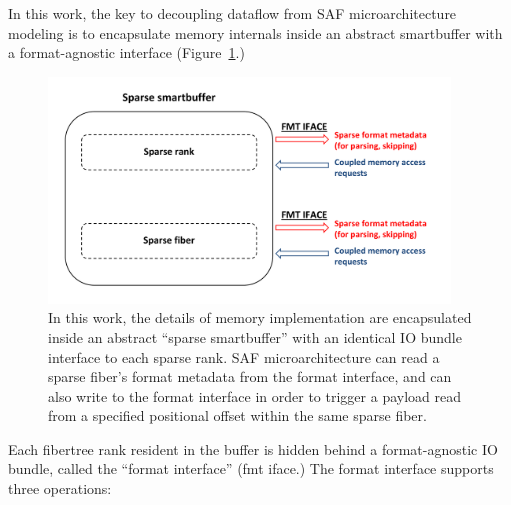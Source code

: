 In this work, the key to decoupling dataflow from SAF microarchitecture modeling is to encapsulate memory internals inside an abstract smartbuffer with a format-agnostic interface (Figure~\ref{fig:sparse_sbuff_overview}.) 

\begin{figure}[ht]
    \centering
    \includegraphics[width=0.95\textwidth]{figures/sparse_sbuff_overview.pdf}
    \caption{In this work, the details of memory implementation are encapsulated inside an abstract ``sparse smartbuffer'' with an identical IO bundle interface to each sparse rank. SAF microarchitecture can read a sparse fiber's format metadata from the format interface, and can also write to the format interface in order to trigger a payload read from a specified positional offset within the same sparse fiber.}
    \label{fig:sparse_sbuff_overview}
\end{figure}

Each fibertree rank resident in the buffer is hidden behind a format-agnostic IO bundle, called the ``format interface'' (fmt iface.) The format interface supports three operations:

